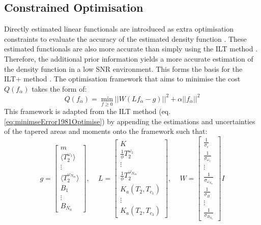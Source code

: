 \subsection{Constrained Optimisation}
    Directly estimated linear functionals are introduced as extra optimisation constraints to evaluate the accuracy of the estimated density function \cite{GruberT2Estimation2013}. These estimated functionals are also more accurate than simply using the ILT method \cite{GruberLinearFunctionals2013}. Therefore, the additional prior information yields a more accurate estimation of the density function in a low SNR environment. This forms the basis for the ILT+ method \cite{GruberT2Estimation2013}. The optimisation framework that aims to minimise the cost $Q(f_\alpha)$ takes the form of:
\begin{equation}
    Q(f_\alpha) = \min_{f\geq0}  ||W(Lf_\alpha - g)||^2 + \alpha||f_\alpha||^2
    \label{eq:2013Optimise}    
\end{equation}
    This framework is adapted from the ILT method (eq. \ref{eq:minimseError1981Optimise}) by appending the estimations and uncertainties of the tapered areas and moments onto the framework \cite{GruberT2Estimation2013} such that:
 \begin{equation}
    g = 
    \begin{bmatrix}
    m  \\
    \langle T_2^{\omega_1} \rangle \\
    \vdots \\
    \langle T_2^{\omega_{N_{m}}} \rangle \\
    B_1 \\
    \vdots \\
    B_{N_{a}}
    \end{bmatrix}
    \text{, } \quad
    L = 
    \begin{bmatrix}
    K  \\
    \frac{1}{\phi}T_{2}^{\omega_1}\\
    \vdots \\
    \frac{1}{\phi}T_{2}^{\omega_{N_{m}}}\\    
    K_{a}(T_2,T_{c_{1}}) \\
    \vdots \\
    K_{a}(T_2,T_{c_{3}})     
    \end{bmatrix}
    \text{, } \quad
    W = 
    \begin{bmatrix}
    \frac{1}{\sigma_\epsilon}  \\
    \frac{1}{\sigma_{\omega_1}}  \\ 
    \vdots \\
    \frac{1}{\sigma_{\omega_{N_{m}}}} \\
    \frac{1}{\sigma_B}\\
    \vdots\\
    \frac{1}{\sigma_{B_{N_{a}}}}
    \end{bmatrix}
    I
    \label{eq:2013NewOptVectors}  
\end{equation}    

